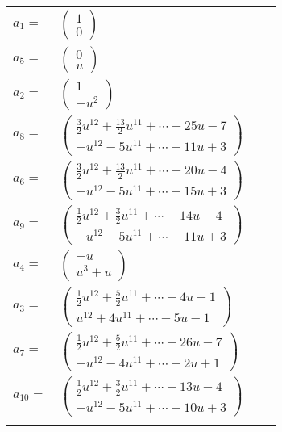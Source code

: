 \documentclass[1p]{elsarticle_modified}
\theoremstyle{definition}
\begin{document}
\begin{tabular}{m{7pt} m{180pt} m{7pt} m{180pt} }
\flushright $a_{1}=$&$\begin{pmatrix}1\\0\end{pmatrix}$ \\
\flushright $a_{5}=$&$\begin{pmatrix}0\\u\end{pmatrix}$ \\
\flushright $a_{2}=$&$\begin{pmatrix}1\\- u^2\end{pmatrix}$ \\
\flushright $a_{8}=$&$\begin{pmatrix}\frac{3}{2} u^{12}+\frac{13}{2} u^{11}+\cdots-25 u-7\\- u^{12}-5 u^{11}+\cdots+11 u+3\end{pmatrix}$ \\
\flushright $a_{6}=$&$\begin{pmatrix}\frac{3}{2} u^{12}+\frac{13}{2} u^{11}+\cdots-20 u-4\\- u^{12}-5 u^{11}+\cdots+15 u+3\end{pmatrix}$ \\
\flushright $a_{9}=$&$\begin{pmatrix}\frac{1}{2} u^{12}+\frac{3}{2} u^{11}+\cdots-14 u-4\\- u^{12}-5 u^{11}+\cdots+11 u+3\end{pmatrix}$ \\
\flushright $a_{4}=$&$\begin{pmatrix}- u\\u^3+u\end{pmatrix}$ \\
\flushright $a_{3}=$&$\begin{pmatrix}\frac{1}{2} u^{12}+\frac{5}{2} u^{11}+\cdots-4 u-1\\u^{12}+4 u^{11}+\cdots-5 u-1\end{pmatrix}$ \\
\flushright $a_{7}=$&$\begin{pmatrix}\frac{1}{2} u^{12}+\frac{5}{2} u^{11}+\cdots-26 u-7\\- u^{12}-4 u^{11}+\cdots+2 u+1\end{pmatrix}$ \\
\flushright $a_{10}=$&$\begin{pmatrix}\frac{1}{2} u^{12}+\frac{3}{2} u^{11}+\cdots-13 u-4\\- u^{12}-5 u^{11}+\cdots+10 u+3\end{pmatrix}$\\&\end{tabular}
\end{document}
